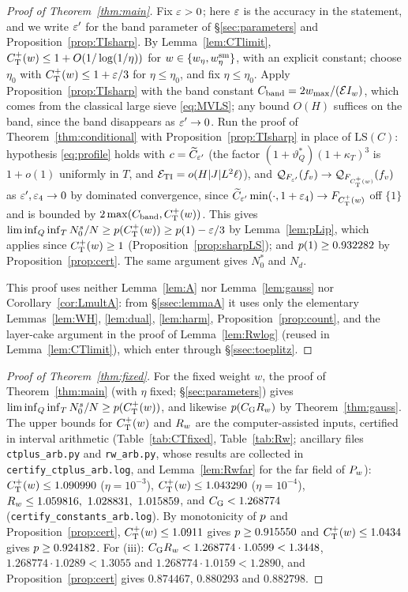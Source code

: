 \documentclass[11pt]{amsart}
\theoremstyle{definition}
\theoremstyle{remark}
\numberwithin{equation}{section}
\begin{document}
\begin{proof}[Proof of Theorem~\ref{thm:main}]
Fix $\varepsilon>0$; here $\varepsilon$ is the accuracy in the statement, and we write $\varepsilon'$ for the band parameter of \S\ref{sec:parameters} and Proposition~\ref{prop:TIsharp}. By Lemma~\ref{lem:CTlimit}, $C^{+}_{\mathrm T}(w)\le1+O(1/\log(1/\eta))$ for $w\in\{w_\eta,w^{\mathrm{sm}}_\eta\}$, with an explicit constant; choose $\eta_0$ with $C^{+}_{\mathrm T}(w)\le1+\varepsilon/3$ for $\eta\le\eta_0$, and fix $\eta\le\eta_0$. Apply Proposition~\ref{prop:TIsharp} with the band constant $C_{\rm band}=2w_{\max}/(\mathcal EI_w)$, which comes from the classical large sieve \eqref{eq:MVLS}; any bound $O(H)$ suffices on the band, since the band disappears as $\varepsilon'\to0$. Run the proof of Theorem~\ref{thm:conditional} with Proposition~\ref{prop:TIsharp} in place of $\mathrm{LS}(C)$: hypothesis \eqref{eq:profile} holds with $c=\widetilde C_{\varepsilon'}$ (the factor $(1+\vartheta^*_Q)(1+\kappa_T)^3$ is $1+o(1)$ uniformly in $T$, and $\mathcal E_{\rm TI}=o(H|J|L^2\ell)$), and $\mathcal Q_{F_{\varepsilon'}}(f_v)\to\mathcal Q_{F_{C^{+}_{\mathrm T}(w)}}(f_v)$ as $\varepsilon',\varepsilon_4\to0$ by dominated convergence, since $\widetilde C_{\varepsilon'}\min(\cdot,1+\varepsilon_4)\to F_{C^{+}_{\mathrm T}(w)}$ off $\{1\}$ and is bounded by $2\max(C_{\rm band},C^{+}_{\mathrm T}(w))$. This gives $\liminf_Q\inf_TN^s_0/N\ge p(C^{+}_{\mathrm T}(w))\ge p(1)-\varepsilon/3$ by Lemma~\ref{lem:pLip}, which applies since $C^{+}_{\mathrm T}(w)\ge1$ (Proposition~\ref{prop:sharpLS}); and $p(1)\ge0.932282$ by Proposition~\ref{prop:cert}. The same argument gives $N^*_0$ and $N_d$.

This proof uses neither Lemma~\ref{lem:A} nor Lemma~\ref{lem:gauss} nor Corollary~\ref{cor:LmultA}: from \S\ref{ssec:lemmaA} it uses only the elementary Lemmas~\ref{lem:WH}, \ref{lem:dual}, \ref{lem:harm}, Proposition~\ref{prop:count}, and the layer-cake argument in the proof of Lemma~\ref{lem:Rwlog} (reused in Lemma~\ref{lem:CTlimit}), which enter through \S\ref{ssec:toeplitz}.
\end{proof}

\begin{proof}[Proof of Theorem~\ref{thm:fixed}]
For the fixed weight $w$, the proof of Theorem~\ref{thm:main} (with $\eta$ fixed; \S\ref{sec:parameters}) gives $\liminf_Q\inf_TN^s_0/N\ge p(C^{+}_{\mathrm T}(w))$, and likewise $p(C_{\mathrm G}R_w)$ by Theorem~\ref{thm:gauss}. The upper bounds for $C^{+}_{\mathrm T}(w)$ and $R_w$ are the computer-assisted inputs, certified in interval arithmetic (Table~\ref{tab:CTfixed}, Table~\ref{tab:Rw}; ancillary files \texttt{ctplus\_arb.py} and \texttt{rw\_arb.py}, whose results are collected in \texttt{certify\_ctplus\_arb.log}, and Lemma~\ref{lem:Rwfar} for the far field of $P_w$): $C^{+}_{\mathrm T}(w)\le1.090990$ ($\eta=10^{-3}$), $C^{+}_{\mathrm T}(w)\le1.043290$ ($\eta=10^{-4}$), $R_w\le1.059816,\ 1.028831,\ 1.015859$, and $C_{\mathrm G}<1.268774$ (\texttt{certify\_constants\_arb.log}). By monotonicity of $p$ and Proposition~\ref{prop:cert}, $C^{+}_{\mathrm T}(w)\le1.0911$ gives $p\ge0.915550$ and $C^{+}_{\mathrm T}(w)\le1.0434$ gives $p\ge0.924182$. For (iii): $C_{\mathrm G}R_w<1.268774\cdot1.0599<1.3448$, $1.268774\cdot1.0289<1.3055$ and $1.268774\cdot1.0159<1.2890$, and Proposition~\ref{prop:cert} gives $0.874467$, $0.880293$ and $0.882798$.
\end{proof}
\end{document}
